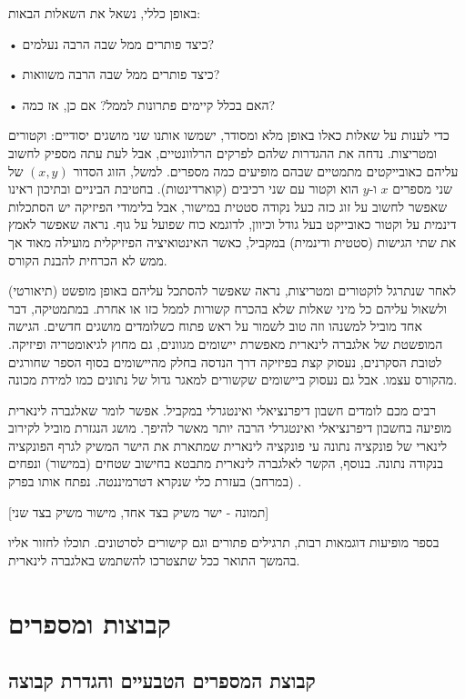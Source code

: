 \documentclass[
  hebrew,
  12pt,
  a4paper,
  oneside]{book}
\theoremstyle{definition}
\theoremstyle{remark}
\theoremstyle{plain}
\theoremstyle{remark}
\begin{document}
באופן כללי, נשאל את השאלות הבאות:

• כיצד פותרים ממל שבה הרבה נעלמים?

• כיצד פותרים ממל שבה הרבה משוואות?

• האם בכלל קיימים פתרונות לממל? אם כן, אז כמה?

כדי לענות על שאלות כאלו באופן מלא ומסודר, ישמשו אותנו שני מושגים
יסודיים: וקטורים ומטריצות. נדחה את ההגדרות שלהם לפרקים הרלוונטיים, אבל
לעת עתה מספיק לחשוב עליהם כאובייקטים מתמטיים שבהם מופיעים כמה מספרים.
למשל, הזוג הסדור \((x,y)\) של שני מספרים \(x\) ו-\(y\) הוא וקטור עם שני
רכיבים (קוארדינטות). בחטיבת הביניים ובתיכון ראינו שאפשר לחשוב על זוג כזה
כעל נקודה סטטית במישור, אבל בלימודי הפיזיקה יש הסתכלות דינמית על וקטור
כאובייקט בעל גודל וכיוון, לדוגמא כוח שפועל על גוף. נראה שאפשר לאמץ את
שתי הגישות (סטטית ודינמית) במקביל, כאשר האינטואיציה הפיזיקלית מועילה
מאוד אך ממש לא הכרחית להבנת הקורס.

לאחר שנתרגל לוקטורים ומטריצות, נראה שאפשר להסתכל עליהם באופן מופשט
(תיאורטי) ולשאול עליהם כל מיני שאלות שלא בהכרח קשורות לממל כזו או אחרת.
במתמטיקה, דבר אחד מוביל למשנהו וזה טוב לשמור על ראש פתוח כשלומדים מושגים
חדשים. הגישה המופשטת של אלגברה לינארית מאפשרת יישומים מגוונים, גם מחוץ
לגיאומטריה ופיזיקה. לטובת הסקרנים, נעסוק קצת בפיזיקה דרך הנדסה בחלק
מהיישומים בסוף הספר שחורגים מהקורס עצמו. אבל גם נעסוק ביישומים שקשורים
למאגר גדול של נתונים כמו למידת מכונה.

רבים מכם לומדים חשבון דיפרנציאלי ואינטגרלי במקביל. אפשר לומר שאלגברה
לינארית מופיעה בחשבון דיפרנציאלי ואינטגרלי הרבה יותר מאשר להיפך. מושג
הנגזרת מוביל לקירוב לינארי של פונקציה נתונה עי פונקציה לינארית שמתארת את
הישר המשיק לגרף הפונקציה בנקודה נתונה. בנוסף, הקשר לאלגברה לינארית מתבטא
בחישוב שטחים (במישור) ונפחים (במרחב) בעזרת כלי שנקרא דטרמיננטה. נפתח
אותו בפרק .

{[}תמונה - ישר משיק בצד אחד, מישור משיק בצד שני{]}

בספר מופיעות דוגמאות רבות, תרגילים פתורים וגם קישורים לסרטונים. תוכלו
לחזור אליו בהמשך התואר ככל שתצטרכו להשתמש באלגברה לינארית.


\chapter{קבוצות
ומספרים}\label{ux5e7ux5d1ux5d5ux5e6ux5d5ux5ea-ux5d5ux5deux5e1ux5e4ux5e8ux5d9ux5dd}

\section{קבוצת המספרים הטבעיים והגדרת
קבוצה}\label{ux5e7ux5d1ux5d5ux5e6ux5ea-ux5d4ux5deux5e1ux5e4ux5e8ux5d9ux5dd-ux5d4ux5d8ux5d1ux5e2ux5d9ux5d9ux5dd-ux5d5ux5d4ux5d2ux5d3ux5e8ux5ea-ux5e7ux5d1ux5d5ux5e6ux5d4}
\end{document}
